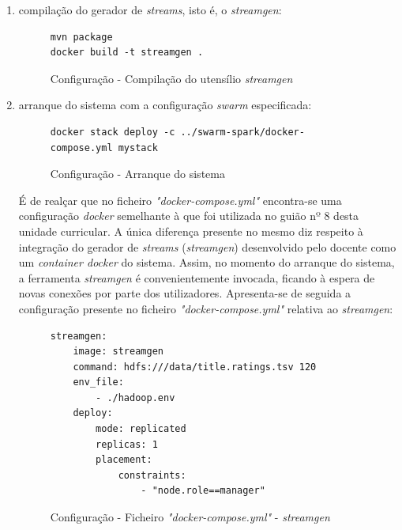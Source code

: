\documentclass[a4paper]{report}
\begin{document}
{\begin{enumerate}[label=\textbf{\arabic*.}]
                \item compilação do gerador de \textit{streams}, isto é, o \textit{streamgen}:
                \begin{figure}[H]
                    \centering
                    \begin{verbatim}
mvn package
docker build -t streamgen .
                    \end{verbatim}
                    \vspace{-5mm}
                    \caption{Configuração - Compilação do utensílio \textit{streamgen}}
                    \label{fig:9}
                \end{figure}

                \item arranque do sistema com a configuração \textit{swarm} especificada:
                \begin{figure}[H]
                    \centering
                    \begin{verbatim}
docker stack deploy -c ../swarm-spark/docker-compose.yml mystack
                    \end{verbatim}
                    \vspace{-5mm}
                    \caption{Configuração - Arranque do sistema}
                    \label{fig:10}
                \end{figure}

                É de realçar que no ficheiro \textit{"docker-compose.yml"} encontra-se uma configuração \textit{docker} semelhante à que foi utilizada no guião nº 8 desta unidade curricular.
                A única diferença presente no mesmo diz respeito à integração do gerador de \textit{streams} (\textit{streamgen}) desenvolvido pelo docente como um \textit{container docker} do sistema.
                Assim, no momento do arranque do sistema, a ferramenta \textit{streamgen} é convenientemente invocada, ficando à espera de novas conexões por parte dos utilizadores.
                Apresenta-se de seguida a configuração presente no ficheiro \textit{"docker-compose.yml"} relativa ao \textit{streamgen}:

                \begin{figure}[H]
                    \centering
                    \begin{verbatim}
streamgen:
    image: streamgen
    command: hdfs:///data/title.ratings.tsv 120
    env_file:
        - ./hadoop.env
    deploy:
        mode: replicated
        replicas: 1
        placement:
            constraints:
                - "node.role==manager"
                    \end{verbatim}
                    \vspace{-5mm}
                    \caption{Configuração - Ficheiro \textit{"docker-compose.yml"} - \textit{streamgen}}
                    \label{fig:11}
                \end{figure}


\end{enumerate}}
\end{document}
